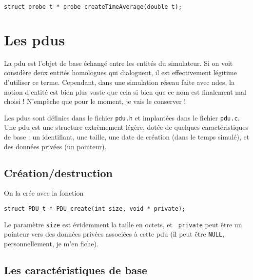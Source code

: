 \documentclass{article}
\begin{document}
\begin{verbatim}
struct probe_t * probe_createTimeAverage(double t);
\end{verbatim}


%
\section{Les {\sc pdu}s}
\label{section:pdu}

   La {\sc pdu} est l'objet de base échangé entre les entités du
simulateur. Si on voit considère deux entités homologues qui
dialoguent, il est effectivement légitime d'utiliser ce
terme. Cependant, dans une simulation réseau faite avec {\sc ndes}, la
notion d'entité est bien plus vaste que cela si bien que ce nom est
finalement mal choisi ! N'empèche que pour le moment, je vais le
conserver !

   Les {\sc pdu}s sont définies dans le fichier {\tt pdu.h} et
implantées dans le fichier {\tt pdu.c}. Une {\sc pdu} est une
structure extrèmement légère, dotée de quelques caractéristiques de
base : un identifiant, une taille, une date de création (dans le temps
simulé), et des données privées (un pointeur).

%
\subsection{Création/destruction}

   On la crée avec la fonction

\begin{verbatim}
struct PDU_t * PDU_create(int size, void * private);
\end{verbatim}

   Le paramètre {\tt size} est évidemment la taille en octets, et {\tt
private} peut être un pointeur vers des données privées associées à
cette {\sc pdu} (il peut être {\tt NULL}, personnellement, je m'en
fiche).

%
\subsection{Les caractéristiques de base}
\end{document}
